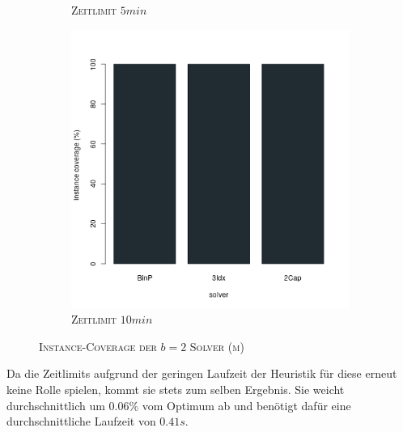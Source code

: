 \begin{figure}[H]
\begin{subfigure}[b]{0.3\textwidth}
\caption{\textsc{Zeitlimit} $5min$}
\label{fig:instance_cov_b=2_m_b}
\end{subfigure}
\hfill
\begin{subfigure}[b]{0.3\textwidth}
\centering
\includegraphics[width=1.2\textwidth]{img/solver_instance_coverage_b=2_m_600s.png}
\caption{\textsc{Zeitlimit} $10min$}
\label{fig:instance_cov_b=2_m_c}
\end{subfigure}
\caption{\textsc{Instance-Coverage der $b=2$ Solver (m)}}
\label{fig:instance_cov_b=2}
\end{figure}

Da die Zeitlimits aufgrund der geringen Laufzeit der Heuristik für diese erneut keine Rolle spielen,
kommt sie stets zum selben Ergebnis. Sie weicht durchschnittlich um $0.06 \%$ vom
Optimum ab und benötigt dafür eine durchschnittliche Laufzeit von $0.41s$.

